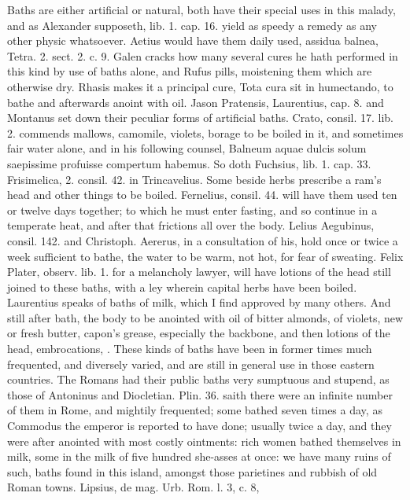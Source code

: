 {Baths are either artificial or natural, both have their special uses in
this malady, and as Alexander supposeth, lib. 1. cap. 16. yield
as speedy a remedy as any other physic whatsoever. Aetius would have
them daily used, assidua balnea, Tetra. 2. sect. 2. c. 9. Galen cracks
how many several cures he hath performed in this kind by use of baths
alone, and Rufus pills, moistening them which are otherwise dry. Rhasis
makes it a principal cure, Tota cura sit in humectando, to bathe and
afterwards anoint with oil. Jason Pratensis, Laurentius, cap. 8. and
Montanus set down their peculiar forms of artificial baths. Crato,
consil. 17. lib. 2. commends mallows, camomile, violets, borage to be
boiled in it, and sometimes fair water alone, and in his following
counsel, Balneum aquae dulcis solum saepissime profuisse compertum
habemus. So doth Fuchsius, lib. 1. cap. 33. Frisimelica, 2. consil. 42.
in Trincavelius. Some beside herbs prescribe a ram's head and other
things to be boiled.  Fernelius, consil. 44. will have them used
ten or twelve days together; to which he must enter fasting, and so
continue in a temperate heat, and after that frictions all over the
body. Lelius Aegubinus, consil. 142. and Christoph. Aererus, in a
consultation of his, hold once or twice a week sufficient to bathe, the
water to be warm, not hot, for fear of sweating. Felix Plater,
observ. lib. 1. for a melancholy lawyer,  will have lotions of
the head still joined to these baths, with a ley wherein capital herbs
have been boiled. Laurentius speaks of baths of milk, which I
find approved by many others. And still after bath, the body to be
anointed with oil of bitter almonds, of violets, new or fresh butter,
capon's grease, especially the backbone, and then lotions of the
head, embrocations, \etc{}. These kinds of baths have been in former times
much frequented, and diversely varied, and are still in general use in
those eastern countries. The Romans had their public baths very
sumptuous and stupend, as those of Antoninus and Diocletian. Plin. 36.
saith there were an infinite number of them in Rome, and mightily
frequented; some bathed seven times a day, as Commodus the emperor is
reported to have done; usually twice a day, and they were after
anointed with most costly ointments: rich women bathed themselves in
milk, some in the milk of five hundred she-asses at once: we have many
ruins of such, baths found in this island, amongst those parietines and
rubbish of old Roman towns. Lipsius, de mag. Urb. Rom. l. 3, c. 8,
}

